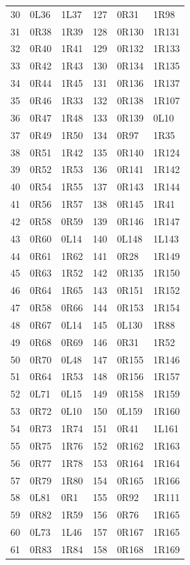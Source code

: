 \begin{longtable}{@{}rll@{\hspace{2.5em}}rll@{}}
30 & 0L36 & 1L37 & 127 & 0R31 & 1R98 \\
31 & 0R38 & 1R39 & 128 & 0R130 & 1R131 \\
32 & 0R40 & 1R41 & 129 & 0R132 & 1R133 \\
33 & 0R42 & 1R43 & 130 & 0R134 & 1R135 \\
34 & 0R44 & 1R45 & 131 & 0R136 & 1R137 \\
35 & 0R46 & 1R33 & 132 & 0R138 & 1R107 \\
36 & 0R47 & 1R48 & 133 & 0R139 & 0L10 \\
37 & 0R49 & 1R50 & 134 & 0R97 & 1R35 \\
38 & 0R51 & 1R42 & 135 & 0R140 & 1R124 \\
39 & 0R52 & 1R53 & 136 & 0R141 & 1R142 \\
40 & 0R54 & 1R55 & 137 & 0R143 & 1R144 \\
41 & 0R56 & 1R57 & 138 & 0R145 & 1R41 \\
42 & 0R58 & 0R59 & 139 & 0R146 & 1R147 \\
43 & 0R60 & 0L14 & 140 & 0L148 & 1L143 \\
44 & 0R61 & 1R62 & 141 & 0R28 & 1R149 \\
45 & 0R63 & 1R52 & 142 & 0R135 & 1R150 \\
46 & 0R64 & 1R65 & 143 & 0R151 & 1R152 \\
47 & 0R58 & 0R66 & 144 & 0R153 & 1R154 \\
48 & 0R67 & 0L14 & 145 & 0L130 & 1R88 \\
49 & 0R68 & 0R69 & 146 & 0R31 & 1R52 \\
50 & 0R70 & 0L48 & 147 & 0R155 & 1R146 \\
51 & 0R64 & 1R53 & 148 & 0R156 & 1R157 \\
52 & 0L71 & 0L15 & 149 & 0R158 & 1R159 \\
53 & 0R72 & 0L10 & 150 & 0L159 & 1R160 \\
54 & 0R73 & 1R74 & 151 & 0R41 & 1L161 \\
55 & 0R75 & 1R76 & 152 & 0R162 & 1R163 \\
56 & 0R77 & 1R78 & 153 & 0R164 & 1R164 \\
57 & 0R79 & 1R80 & 154 & 0R165 & 1R166 \\
58 & 0L81 & 0R1 & 155 & 0R92 & 1R111 \\
59 & 0R82 & 1R59 & 156 & 0R76 & 1R165 \\
60 & 0L73 & 1L46 & 157 & 0R167 & 1R165 \\
61 & 0R83 & 1R84 & 158 & 0R168 & 1R169 \\

\end{longtable}
